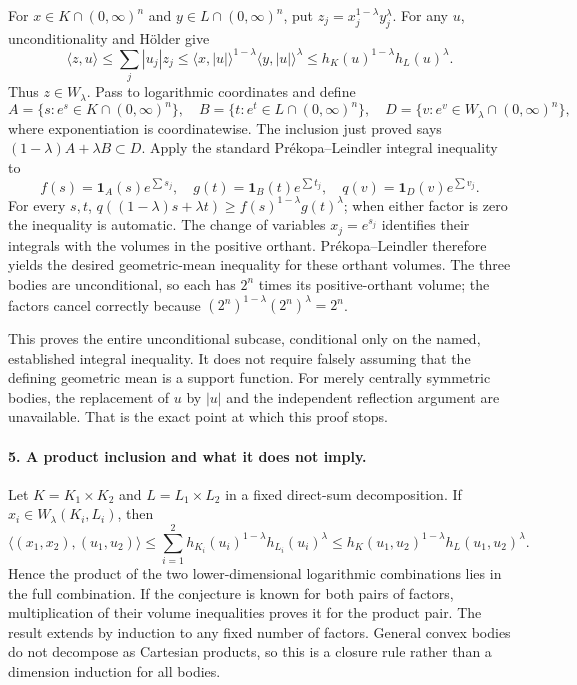 \documentclass[11pt]{article}
\begin{document}
For $x\in K\cap(0,\infty)^n$ and $y\in L\cap(0,\infty)^n$, put $z_j=x_j^{1-\lambda}y_j^\lambda$. For any $u$, unconditionality and H\"older give
\[
 \langle z,u\rangle\leq\sum_j|u_j|z_j
 \leq\langle x,|u|\rangle^{1-\lambda}
       \langle y,|u|\rangle^\lambda
 \leq h_K(u)^{1-\lambda}h_L(u)^\lambda.
\]
Thus $z\in W_\lambda$. Pass to logarithmic coordinates and define
\[
 A=\{s:e^s\in K\cap(0,\infty)^n\},\quad
 B=\{t:e^t\in L\cap(0,\infty)^n\},\quad
 D=\{v:e^v\in W_\lambda\cap(0,\infty)^n\},
\]
where exponentiation is coordinatewise. The inclusion just proved says $(1-\lambda)A+\lambda B\subset D$. Apply the standard Pr\'ekopa--Leindler integral inequality to
\[
 f(s)=\mathbf1_A(s)e^{\sum s_j},\quad
 g(t)=\mathbf1_B(t)e^{\sum t_j},\quad
 q(v)=\mathbf1_D(v)e^{\sum v_j}.
\]
For every $s,t$, $q((1-\lambda)s+\lambda t)\geq f(s)^{1-\lambda}g(t)^\lambda$; when either factor is zero the inequality is automatic. The change of variables $x_j=e^{s_j}$ identifies their integrals with the volumes in the positive orthant. Pr\'ekopa--Leindler therefore yields the desired geometric-mean inequality for these orthant volumes. The three bodies are unconditional, so each has $2^n$ times its positive-orthant volume; the factors cancel correctly because $(2^n)^{1-\lambda}(2^n)^\lambda=2^n$.

This proves the entire unconditional subcase, conditional only on the named, established integral inequality. It does not require falsely assuming that the defining geometric mean is a support function. For merely centrally symmetric bodies, the replacement of $u$ by $|u|$ and the independent reflection argument are unavailable. That is the exact point at which this proof stops.

\paragraph{5. A product inclusion and what it does not imply.}
Let $K=K_1\times K_2$ and $L=L_1\times L_2$ in a fixed direct-sum decomposition. If $x_i\in W_\lambda(K_i,L_i)$, then
\[
 \langle(x_1,x_2),(u_1,u_2)\rangle
 \leq\sum_{i=1}^2 h_{K_i}(u_i)^{1-\lambda}h_{L_i}(u_i)^\lambda
 \leq h_K(u_1,u_2)^{1-\lambda}h_L(u_1,u_2)^\lambda.
\]
Hence the product of the two lower-dimensional logarithmic combinations lies in the full combination. If the conjecture is known for both pairs of factors, multiplication of their volume inequalities proves it for the product pair. The result extends by induction to any fixed number of factors. General convex bodies do not decompose as Cartesian products, so this is a closure rule rather than a dimension induction for all bodies.
\end{document}
